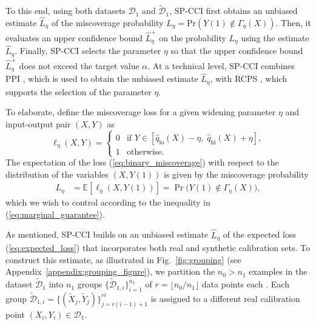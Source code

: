 \documentclass{article}
\theoremstyle{plain}
\theoremstyle{definition}
\theoremstyle{remark}
\begin{document}
To this end, using both datasets $\mathcal{D}_1$ and $\tilde{\mathcal{D}}_1$, SP-CCI first obtains an unbiased estimate $\hat{L}_\eta$ of the miscoverage probability $L_\eta = \mathrm{Pr}\left(Y(1) \notin \Gamma_\eta(X)\right)$. Then, it evaluates an upper confidence bound $\hat{L}^+_\eta$ on the probability $L_\eta$ using the estimate $\hat{L}_\eta$. Finally, SP-CCI selects the parameter $\eta$ so that the upper confidence bound $\hat{L}^+_\eta$ does not exceed the target value $\alpha$. At a technical level, SP-CCI combines PPI \citep{angelopoulos2023prediction}, which is used to obtain the unbiased estimate $\hat{L}_\eta$, with RCPS \citep{bates2021distribution}, which supports the selection of the parameter $\eta$.



To elaborate, define the miscoverage loss for a given widening parameter $\eta$ and input-output pair $(X,Y)$ as
\begin{equation}
\label{eq:binary_miscoverage}
    \ell_\eta(X, Y) =
    \begin{cases}
        0 & \text{if } Y \in [\hat{q}_{\text{lo}}(X) - \eta,\; \hat{q}_{\text{hi}}(X) + \eta], \\
        1 & \text{otherwise}.
    \end{cases}
\end{equation}
The expectation of the loss (\ref{eq:binary_miscoverage}) with respect to the distribution of the variables $\left(X, Y(1)\right)$ is given by the miscoverage probability
\begin{equation}
\label{eq:expected_loss}
\begin{split}
L_\eta
&= \mathbb{E}\!\left[\ell_\eta(X, Y(1))\right]
= \Pr\!\big( Y(1) \notin \Gamma_\eta(X) \big),
\end{split}
\end{equation}
which we wish to control according to the inequality in (\ref{eq:marginal_guarantee}).

As mentioned, SP-CCI builds on an unbiased estimate $\hat{L}_\eta$ of the expected loss (\ref{eq:expected_loss}) that incorporates both real and synthetic calibration sets. To construct this estimate, as illustrated in Fig.~\ref{fig:grouping} (see Appendix~\ref{appendix:grouping_figure}), we partition the $n_0 > n_1$ examples in the dataset $\tilde{\mathcal{D}}_1$ into $n_1$ groups $\{\tilde{\mathcal{D}}_{1, i}\}_{i = 1}^{n_1}$ of $r =  \lfloor n_0 / n_1 \rfloor$ data points each \citep{einbinder2024semi, park2025adaptive}. Each group $\tilde{\mathcal{D}}_{1, i} = \{(\tilde{X}_j, \tilde{Y}_j)\}_{j = r(i-1)+1}^{ri}$ is assigned to a different real calibration point \( (X_i, Y_i) \in \mathcal{D}_1 \).
\end{document}
